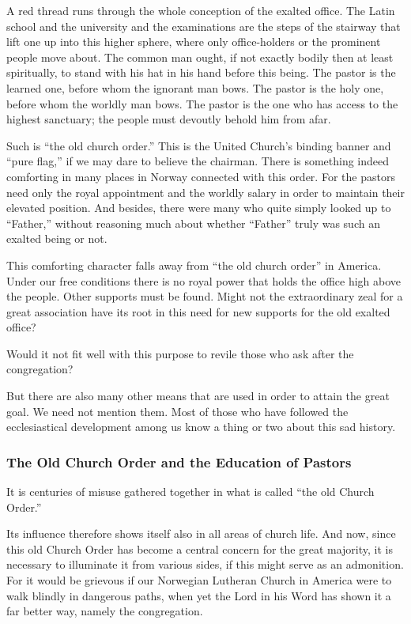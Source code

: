 A red thread runs through the whole conception of the exalted office. The Latin school and the university and the examinations are the steps of the stairway that lift one up into this higher sphere, where only office-holders or the prominent people move about. The common man ought, if not exactly bodily then at least spiritually, to stand with his hat in his hand before this being. The pastor is the learned one, before whom the ignorant man bows. The pastor is the holy one, before whom the worldly man bows. The pastor is the one who has access to the highest sanctuary; the people must devoutly behold him from afar.

Such is “the old church order.” This is the United Church’s binding banner and “pure flag,” if we may dare to believe the chairman. There is something indeed comforting in many places in Norway connected with this order. For the pastors need only the royal appointment and the worldly salary in order to maintain their elevated position. And besides, there were many who quite simply looked up to “Father,” without reasoning much about whether “Father” truly was such an exalted being or not.

This comforting character falls away from “the old church order” in America. Under our free conditions there is no royal power that holds the office high above the people. Other supports must be found. Might not the extraordinary zeal for a great association have its root in this need for new supports for the old exalted office?

Would it not fit well with this purpose to revile those who ask after the congregation?

But there are also many other means that are used in order to attain the great goal. We need not mention them. Most of those who have followed the ecclesiastical development among us know a thing or two about this sad history.


\subsubsection{The Old Church Order and the Education of Pastors}

It is centuries of misuse gathered together in what is called “the old Church Order.”

Its influence therefore shows itself also in all areas of church life. And now, since this old Church Order has become a central concern for the great majority, it is necessary to illuminate it from various sides, if this might serve as an admonition. For it would be grievous if our Norwegian Lutheran Church in America were to walk blindly in dangerous paths, when yet the Lord in his Word has shown it a far better way, namely the congregation.

